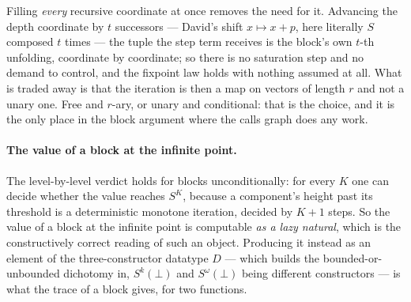 \documentclass[11pt]{article}
\newcommand{\Sw}{S^{\omega}(\bot)}
\newcommand{\D}{D}
\theoremstyle{definition}
\begin{document}
Filling \emph{every} recursive coordinate at once removes the need for it.
Advancing the depth coordinate by $t$ successors --- David's shift
$x \mapsto x+p$, here literally $S$ composed $t$ times --- the tuple the
step term receives is the block's own $t$-th unfolding, coordinate by
coordinate; so there is no saturation step and no demand to control, and
the fixpoint law holds with nothing assumed at all. What is traded away is
that the iteration is then a map on vectors of length $r$ and not a unary
one. Free and $r$-ary, or unary and conditional: that is the choice, and
it is the only place in the block argument where the calls graph does any
work.

\paragraph{The value of a block at the infinite point.} The level-by-level
verdict holds for blocks unconditionally: for every $K$ one can decide
whether the value reaches $S^K$, because a component's height past its
threshold is a deterministic monotone iteration, decided by $K+1$ steps.
So the value of a block at the infinite point is computable \emph{as a
lazy natural}, which is the constructively correct reading of such an
object. Producing it instead as an element of the three-constructor
datatype $\D$ --- which builds the bounded-or-unbounded dichotomy in,
$S^k(\bot)$ and $\Sw$ being different constructors --- is what the trace
of a block gives, for two functions.
\end{document}
